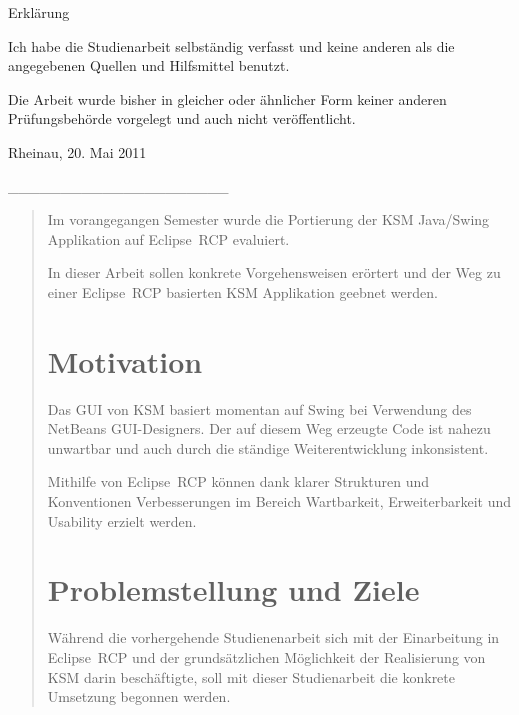 \documentclass[%
12pt,titlepage,abstracton,DIV=10]{scrreprt}
\newcommand{\infoAbgabe}{20. Mai 2011} %
\begin{document}
{\huge Erklärung}

\vspace{2cm}
Ich habe die Studienarbeit selbständig verfasst und keine anderen als
die angegebenen Quellen und Hilfsmittel benutzt.

Die Arbeit wurde bisher in gleicher oder ähnlicher Form keiner anderen
Prüfungsbehörde vorgelegt und auch nicht veröffentlicht.

\vspace{1cm}

Rheinau, \infoAbgabe

\vspace{1cm}

\_\_\_\_\_\_\_\_\_\_\_\_\_\_\_\_\_\_\_\_\_

\newpage
\renewcommand{\abstractname}{Zusammenfassung}
\begin{abstract}
Im vorangegangen Semester wurde die Portierung der KSM Java/Swing Applikation
auf Eclipse~RCP evaluiert.

In dieser Arbeit sollen konkrete Vorgehensweisen erörtert und der Weg zu
einer Eclipse~RCP basierten KSM Applikation geebnet werden.

\section*{Motivation}
Das GUI von KSM basiert momentan auf Swing bei Verwendung des
NetBeans GUI-\-Designers. Der auf diesem Weg erzeugte Code ist nahezu
unwartbar und auch durch die ständige Weiterentwicklung inkonsistent.

Mithilfe von Eclipse~RCP können dank klarer Strukturen und
Konventionen Verbesserungen im Bereich Wartbarkeit, Erweiterbarkeit
und Usability erzielt werden.

\section*{Problemstellung und Ziele}
Während die vorhergehende Studienenarbeit \cite{fischer10} sich mit der
Einarbeitung in Eclipse~RCP und der grundsätzlichen Möglichkeit der Realisierung
von KSM darin beschäftigte, soll mit dieser Studienarbeit die konkrete Umsetzung
begonnen werden.
\end{abstract}
\end{document}
